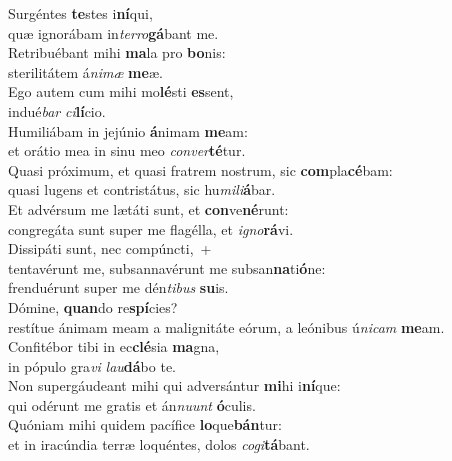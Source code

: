 \oddverse Surgéntes \textbf{te}stes i\textbf{ní}qui,~\*\\
\oddverse quæ ignorábam in\textit{ter}\textit{ro}\textbf{gá}bant me.\\
\evenverse Retribuébant mihi \textbf{ma}la pro \textbf{bo}nis:~\*\\
\evenverse sterilitátem á\textit{ni}\textit{mæ} \textbf{me}æ.\\
\oddverse Ego autem cum mihi mo\textbf{lé}sti \textbf{es}sent,~\*\\
\oddverse indué\textit{bar} \textit{ci}\textbf{lí}cio.\\
\evenverse Humiliábam in jejúnio \textbf{á}nimam \textbf{me}am:~\*\\
\evenverse et orátio mea in sinu meo \textit{con}\textit{ver}\textbf{té}tur.\\
\oddverse Quasi próximum, et quasi fratrem nostrum, sic \textbf{com}pla\textbf{cé}bam:~\*\\
\oddverse quasi lugens et contristátus, sic hu\textit{mi}\textit{li}\textbf{á}bar.\\
\evenverse Et advérsum me lætáti sunt, et \textbf{con}ve\textbf{né}runt:~\*\\
\evenverse congregáta sunt super me flagélla, et \textit{i}\textit{gno}\textbf{rá}vi.\\
\oddverse Dissipáti sunt, nec compúncti,~+\\
\oddverse  tentavérunt me, subsannavérunt me subsan\textbf{na}ti\textbf{ó}ne:~\*\\
\oddverse frenduérunt super me dén\textit{ti}\textit{bus} \textbf{su}is.\\
\evenverse Dómine, \textbf{quan}do re\textbf{spí}cies?~\*\\
\evenverse restítue ánimam meam a malignitáte eórum, a leónibus ú\textit{ni}\textit{cam} \textbf{me}am.\\
\oddverse Confitébor tibi in ec\textbf{clé}sia \textbf{ma}gna,~\*\\
\oddverse in pópulo gra\textit{vi} \textit{lau}\textbf{dá}bo te.\\
\evenverse Non supergáudeant mihi qui adversántur \textbf{mi}hi i\textbf{ní}que:~\*\\
\evenverse qui odérunt me gratis et án\textit{nu}\textit{unt} \textbf{ó}culis.\\
\oddverse Quóniam mihi quidem pacífice \textbf{lo}que\textbf{bán}tur:~\*\\
\oddverse et in iracúndia terræ loquéntes, dolos \textit{co}\textit{gi}\textbf{tá}bant.\\
